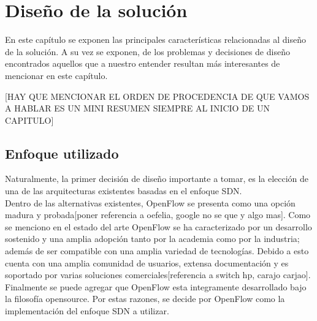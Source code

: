 \chapter{Dise\~no de la soluci\'on}

\ifpdf
    \graphicspath{{Chapter3/Figs/Raster/}{Chapter3/Figs/PDF/}{Chapter3/Figs/}}
\else
    \graphicspath{{Chapter3/Figs/Vector/}{Chapter3/Figs/}}
\fi

En este cap\'itulo se exponen las principales caracter\'isticas relacionadas al dise\~no de la soluci\'on. A su vez se exponen, de los problemas y decisiones de dise\~no encontrados aquellos que a nuestro entender resultan m\'as interesantes de mencionar en este cap\'itulo. 

[HAY QUE MENCIONAR EL ORDEN DE PROCEDENCIA DE QUE VAMOS A HABLAR ES UN MINI RESUMEN SIEMPRE AL INICIO DE UN CAPITULO]
 
\section[Enfoque utilizado]{Enfoque utilizado}


 
Naturalmente, la primer decisi\'on de dise\~no importante a tomar, es la elecci\'on de una de las arquitecturas existentes basadas en el enfoque SDN.\\
  
Dentro de las alternativas existentes, OpenFlow se presenta como una opci\'on madura y probada[poner referencia a oefelia, google no se que y algo mas]. Como se menciono en el estado del arte OpenFlow  se ha caracterizado por un desarrollo sostenido y una amplia adopci\'on tanto por la academia como por la industria; adem\'as de ser compatible con una amplia variedad de tecnolog\'ias. Debido a esto cuenta con una amplia comunidad de usuarios, extensa documentaci\'on y es soportado por varias soluciones comerciales[referencia a switch hp, carajo carjao]. Finalmente se puede agregar que OpenFlow esta integramente desarrollado bajo la filosof\'ia opensource. Por estas razones, se decide por OpenFlow como la implementaci\'on del enfoque SDN a utilizar.\\

